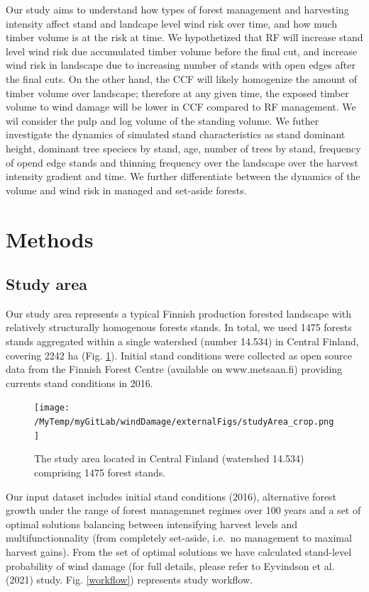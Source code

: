 \documentclass[]{elsarticle} %
\begin{document}
Our study aims to understand how types of forest management and
harvesting intensity affect stand and landcape level wind risk over
time, and how much timber volume is at the risk at time. We hypothetized
that RF will increase stand level wind risk due accumulated timber
volume before the final cut, and increase wind risk in landscape due to
increasing number of stands with open edges after the final cuts. On the
other hand, the CCF will likely homogenize the amount of timber volume
over landscape; therefore at any given time, the exposed timber volume
to wind damage will be lower in CCF compared to RF management. We wil
consider the pulp and log volume of the standing volume. We futher
investigate the dynamics of simulated stand characteristics as stand
dominant height, dominant tree speciecs by stand, age, number of trees
by stand, frequency of opend edge stands and thinning frequency over the
landscape over the harvest intensity gradient and time. We further
differentiate between the dynamics of the volume and wind risk in
managed and set-aside forests.

\section{Methods}\label{methods}

\subsection{Study area}\label{study-area}

Our study area represents a typical Finnish production forested
landscape with relatively structurally homogenous forests stands. In
total, we used 1475 forests stands aggregated within a single watershed
(number 14.534) in Central Finland, covering 2242 ha (Fig.
\ref{study_area}). Initial stand conditions were collected as open
source data from the Finnish Forest Centre (available on www.metsaan.fi)
providing currents stand conditions in 2016.

\begin{figure}
\centering
\texttt{[image: /MyTemp/myGitLab/windDamage/externalFigs/studyArea\_crop.png]}
\caption{The study area located in Central Finland (watershed 14.534)
comprising 1475 forest stands.\label{study_area}}
\end{figure}

Our input dataset includes initial stand conditions (2016), alternative
forest growth under the range of forest managemnet regimes over 100
years and a set of optimal solutions balancing between intensifying
harvest levels and multifunctionnality (from completely set-aside,
i.e.~no management to maximal harvest gains). From the set of optimal
solutions we have calculated stand-level probability of wind damage (for
full details, please refer to Eyvindson et al. (2021) study. Fig.
\ref{workflow}) represents study workflow.
\end{document}
